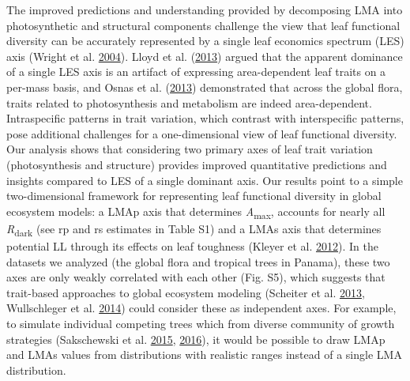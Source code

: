 \documentclass[
  12pt,
]{article}
\begin{document}
The improved predictions and understanding provided by decomposing LMA into photosynthetic and structural components challenge the view that leaf functional diversity can be accurately represented by a single leaf economics spectrum (LES) axis (Wright et al. \protect\hyperlink{ref-Wright2004a}{2004}).
Lloyd et al. (\protect\hyperlink{ref-Lloyd2013}{2013}) argued that the apparent dominance of a single LES axis is an artifact of expressing area-dependent leaf traits on a per-mass basis, and Osnas et al. (\protect\hyperlink{ref-Osnas2013}{2013}) demonstrated that across the global flora, traits related to photosynthesis and metabolism are indeed area-dependent.
Intraspecific patterns in trait variation, which contrast with interspecific patterns, pose additional challenges for a one-dimensional view of leaf functional diversity. Our analysis shows that considering two primary axes of leaf trait variation (photosynthesis and structure) provides improved quantitative predictions and insights compared to LES of a single dominant axis.
Our results point to a simple two-dimensional framework for representing leaf functional diversity in global ecosystem models: a LMAp axis that determines \emph{A}\textsubscript{max}, accounts for nearly all \emph{R}\textsubscript{dark} (see rp and rs estimates in Table S1) and a LMAs axis that determines potential LL through its effects on leaf toughness (Kleyer et al. \protect\hyperlink{ref-Kleyer2012}{2012}).
In the datasets we analyzed (the global flora and tropical trees in Panama), these two axes are only weakly correlated with each other (Fig. S5), which suggests that trait-based approaches to global ecosystem modeling (Scheiter et al. \protect\hyperlink{ref-Scheiter2013}{2013}, Wullschleger et al. \protect\hyperlink{ref-Wullschleger2014}{2014}) could consider these as independent axes.
For example, to simulate individual competing trees which from diverse community of growth strategies (Sakschewski et al. \protect\hyperlink{ref-Sakschewski2015}{2015}, \protect\hyperlink{ref-Sakschewski2016}{2016}), it would be possible to draw LMAp and LMAs values from distributions with realistic ranges instead of a single LMA distribution.
\end{document}

